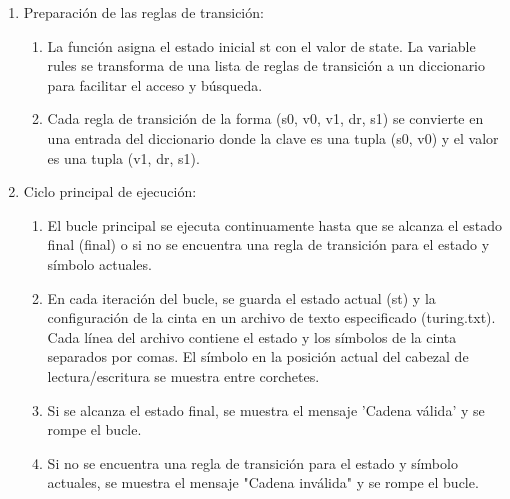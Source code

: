 \begin{enumerate}
    \item Preparación de las reglas de transición:\newline
    \begin{enumerate}
        \item La función asigna el estado inicial st con el valor de state. La variable rules se transforma de una lista de reglas de transición a un diccionario para facilitar el acceso y búsqueda.\newline
        \item Cada regla de transición de la forma (s0, v0, v1, dr, s1) se convierte en una entrada del diccionario donde la clave es una tupla (s0, v0) y el valor es una tupla (v1, dr, s1).\newline
        

    \end{enumerate}
    
    \item Ciclo principal de ejecución:\newline
    \begin{enumerate}
        \item El bucle principal se ejecuta continuamente hasta que se alcanza el estado final (final) o si no se encuentra una regla de transición para el estado y símbolo actuales.\newline
        \item En cada iteración del bucle, se guarda el estado actual (st) y la configuración de la cinta en un archivo de texto especificado (turing.txt). Cada línea del archivo contiene el estado y los símbolos de la cinta separados por comas. El símbolo en la posición actual del cabezal de lectura/escritura se muestra entre corchetes.\newline
        \item Si se alcanza el estado final, se muestra el mensaje 'Cadena válida' y se rompe el bucle.\newline
        \item Si no se encuentra una regla de transición para el estado y símbolo actuales, se muestra el mensaje "Cadena inválida" y se rompe el bucle.\newline
    \end{enumerate}
    

\end{enumerate}
